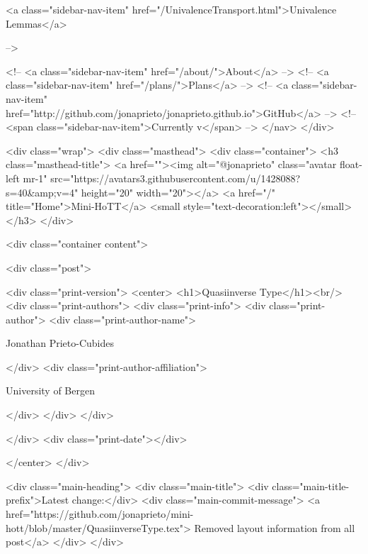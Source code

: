      
    
      
        
          <a class="sidebar-nav-item" href="/UnivalenceTransport.html">Univalence Lemmas</a>
        
      
     -->

    <!-- <a class="sidebar-nav-item" href="/about/">About</a> -->
    <!-- <a class="sidebar-nav-item" href="/plans/">Plans</a> -->
    <!-- <a class="sidebar-nav-item" href="http://github.com/jonaprieto/jonaprieto.github.io">GitHub</a> -->
    <!-- <span class="sidebar-nav-item">Currently v</span> -->
  </nav>
</div>

    <div class="wrap">
      <div class="masthead">
        <div class="container">
          <h3 class="masthead-title">
            <a href=""><img alt="@jonaprieto" class="avatar float-left mr-1" src="https://avatars3.githubusercontent.com/u/1428088?s=40&amp;v=4" height="20" width="20"></a>
            <a href="/" title="Home">Mini-HoTT</a>
            <small style="text-decoration:left"></small>
          </h3>
        </div>
      
      <div class="container content">
        







<div class="post">

  <div class="print-version">
    <center>
      <h1>Quasiinverse Type</h1><br/>
        <div class="print-authors">
          <div class="print-info">
            <div class="print-author">
              <div class="print-author-name">
                
                  Jonathan Prieto-Cubides
                
              </div>
              <div class="print-author-affiliation">
                
                  University of Bergen
                
                </div>
            </div>
          </div>
          
          
        </div>
        <div class="print-date"></div>
        
        
    </center>
  </div>

  
  <div class="main-heading">
    <div class="main-title">
      <div class="main-title-prefix">Latest change:</div>
      <div class="main-commit-message">
            <a href="https://github.com/jonaprieto/mini-hott/blob/master/QuasiinverseType.tex">
              Removed layout information from all post</a>
      </div>
    </div>

